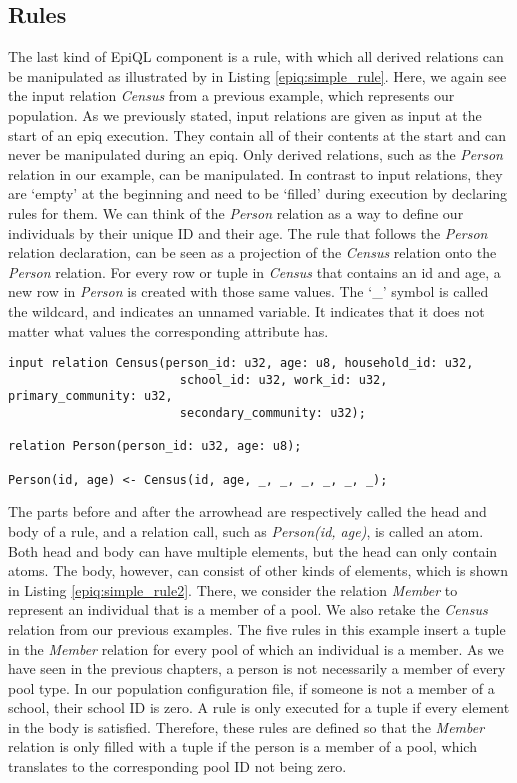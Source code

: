 \subsection{Rules}
\label{subsec:rules}
The last kind of EpiQL component is a rule, with which all derived relations can be manipulated as illustrated by in Listing \ref{epiq:simple_rule}. Here, we again see the input relation \textit{Census} from a previous example, which represents our population. As we previously stated, input relations are given as input at the start of an epiq execution. They contain all of their contents at the start and can never be manipulated during an epiq. Only derived relations, such as the \textit{Person} relation in our example, can be manipulated. In contrast to input relations, they are `empty' at the beginning and need to be `filled' during execution by declaring rules for them. We can think of the \textit{Person} relation as a way to define our individuals by their unique ID and their age. The rule that follows the \textit{Person} relation declaration, can be seen as a projection of the \textit{Census} relation onto the \textit{Person} relation. For every row or tuple in \textit{Census} that contains an id and age, a new row in \textit{Person} is created with those same values. The `\_' symbol is called the wildcard, and indicates an unnamed variable. It indicates that it does not matter what values the corresponding attribute has.

\begin{lstlisting}[caption={A rule projecting the \textit{Census} input relation onto the derived \textit{Person} relation.}, label={epiq:simple_rule}]
input relation Census(person_id: u32, age: u8, household_id: u32, 	
					    school_id: u32, work_id: u32, primary_community: u32, 
					    secondary_community: u32);

relation Person(person_id: u32, age: u8);

Person(id, age) <- Census(id, age, _, _, _, _, _, _);
\end{lstlisting}

The parts before and after the arrowhead are respectively called the head and body of a rule, and a relation call, such as \textit{Person(id, age)}, is called an atom. Both head and body can have multiple elements, but the head can only contain atoms. The body, however, can consist of other kinds of elements, which is shown in Listing \ref{epiq:simple_rule2}. There, we consider the relation \textit{Member} to represent an individual that is a member of a pool. We also retake the \textit{Census} relation from our previous examples. The five rules in this example insert a tuple in the \textit{Member} relation for every pool of which an individual is a member. As we have seen in the previous chapters, a person is not necessarily a member of every pool type. In our population configuration file, if someone is not a member of a school, their school ID is zero. A rule is only executed for a tuple if every element in the body is satisfied. Therefore, these rules are defined so that the \textit{Member} relation is only filled with a tuple if the person is a member of a pool, which translates to the corresponding pool ID not being zero.

